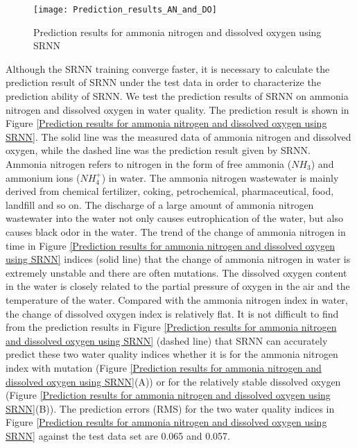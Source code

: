 \documentclass[runningheads]{llncs}
\begin{document}
\begin{figure}[htbp]
\centering
\texttt{[image: Prediction\_results\_AN\_and\_DO]}
\caption{Prediction results for ammonia nitrogen and dissolved oxygen using SRNN}
\label{Prediction results for ammonia nitrogen and dissolved oxygen using SRNN}
\end{figure}

Although the SRNN training converge faster, it is necessary to 
calculate the prediction result of SRNN under the test data in 
order to characterize the prediction ability of SRNN. 
We test the prediction results of SRNN on 
ammonia nitrogen and dissolved oxygen in water quality. 
The prediction result is shown in Figure \ref{Prediction results for ammonia nitrogen
and dissolved oxygen using SRNN}. The solid line 
was the measured data of ammonia nitrogen and dissolved oxygen, 
while the dashed line was the prediction result given by SRNN. 
Ammonia nitrogen refers to nitrogen in the form of free ammonia 
($NH_3$) and ammonium ions ($NH_4^+$) in water. The ammonia nitrogen 
wastewater is mainly derived from chemical fertilizer, coking, 
petrochemical, pharmaceutical, food, landfill and so on. 
The discharge of a large amount of ammonia nitrogen wastewater 
into the water not only causes eutrophication of the water, 
but also causes black odor in the water.
The trend of the change of ammonia nitrogen in time in Figure \ref{Prediction results for ammonia nitrogen
and dissolved oxygen using SRNN} 
indices (solid line) that the change of ammonia nitrogen in water 
is extremely unstable and there are often mutations. 
The dissolved oxygen content in the water is closely related to
the partial pressure of oxygen in the air and the 
temperature of the water. Compared with the ammonia nitrogen 
index in water, the change of dissolved oxygen index 
is relatively flat. It is not difficult to find from the prediction 
results in Figure \ref{Prediction results for ammonia nitrogen
and dissolved oxygen using SRNN} 
(dashed line) that SRNN can accurately predict 
these two water quality indices whether it is for the 
ammonia nitrogen index with mutation (Figure \ref{Prediction results for ammonia nitrogen
and dissolved oxygen using SRNN}(A)) or 
for the relatively stable dissolved oxygen 
(Figure \ref{Prediction results for ammonia nitrogen
and dissolved oxygen using SRNN}(B)). 
The prediction errors (RMS) for the two water quality 
indices in Figure \ref{Prediction results for ammonia nitrogen
and dissolved oxygen using SRNN} against the test data set are 0.065 and 0.057.
\end{document}
